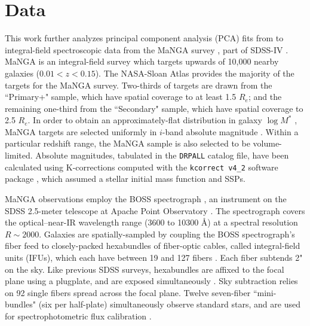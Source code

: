 \section{Data}
\label{chap2:sec:data}

This work further analyzes principal component analysis (PCA) fits from \citet{pace_19a_pca} to integral-field spectroscopic data from the MaNGA survey \citep{bundy15_manga}, part of SDSS-IV \citep{blanton_17_sdss-iv}. MaNGA is an integral-field survey which targets upwards of 10,000 nearby galaxies ($0.01 < z < 0.15$). The NASA-Sloan Atlas \citep[NSA, ][]{blanton_11_nsa} provides the majority of the targets for the MaNGA survey. Two-thirds of targets are drawn from the ``Primary+" sample, which have spatial coverage to at least 1.5 $R_e$; and the remaining one-third from the ``Secondary" sample, which have spatial coverage to 2.5 $R_e$. In order to obtain an approximately-flat distribution in galaxy $\log M^*$ \citep{manga_sample_wake_17}, MaNGA targets are selected uniformly in $i$-band absolute magnitude \citep{fukugita_96_sdss_photo, doi_2010_sdssresponse}. Within a particular redshift range, the MaNGA sample is also selected to be volume-limited. Absolute magnitudes, tabulated in the \texttt{DRPALL} catalog file, have been calculated using K-corrections computed with the \texttt{kcorrect v4\_2} software package \citep{blanton_roweis_07}, which assumed a \citet{chabrier03} stellar initial mass function and \citet{BC03} SSPs.

MaNGA observations employ the BOSS spectrograph \citep{smee_boss_instrument, sdss_boss_dawson_13}, an instrument on the SDSS 2.5-meter telescope at Apache Point Observatory \citep{gunn_sdss_telescope}. The spectrograph covers the optical--near-IR wavelength range (3600 to 10300 $\mbox{\AA}$) at a spectral resolution $R \sim 2000$. Galaxies are spatially-sampled by coupling the BOSS spectrograph's fiber feed to closely-packed hexabundles of fiber-optic cables, called integral-field units (IFUs), which each have between 19 and 127 fibers \citep{manga_inst}. Each fiber subtends 2" on the sky. Like previous SDSS surveys, hexabundles are affixed to the focal plane using a plugplate, and are exposed simultaneously \citep{sdss_summary}. Sky subtraction relies on 92 single fibers spread across the focal plane. Twelve seven-fiber ``mini-bundles" (six per half-plate) simultaneously observe standard stars, and are used for spectrophotometric flux calibration \citep{manga_spectrophot}.

